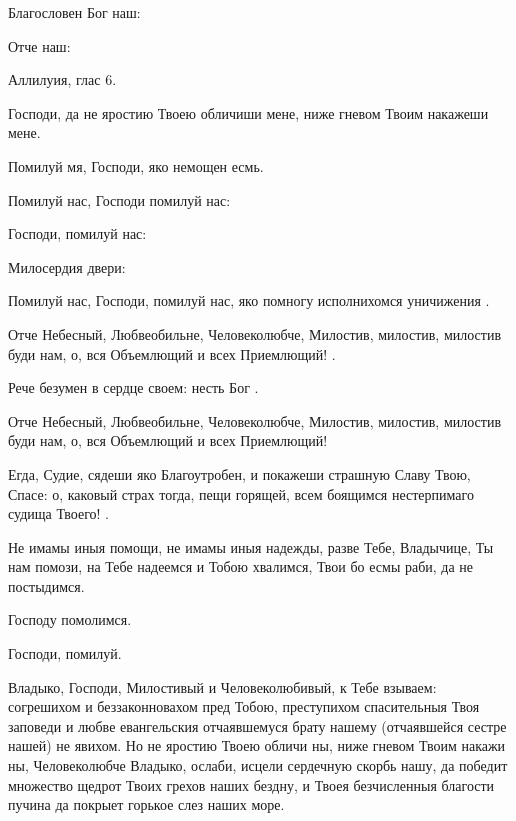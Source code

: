 \begin{mymulticols}

Благословен Бог наш:

 Отче наш:

Аллилуия, глас 6.

 Господи, да не яростию Твоею обличиши мене, ниже гневом Твоим накажеши мене. 

 Помилуй мя, Господи, яко немощен есмь.

 Помилуй нас, Господи помилуй нас:

 Господи, помилуй нас:

 Милосердия двери:



 Помилуй нас, Господи, помилуй нас, яко помногу исполнихомся уничижения .

Отче Небесный, Любвеобильне, Человеколюбче, Милостив, милостив, милостив буди нам, о, вся Объемлющий и всех Приемлющий! .

 Рече безумен в сердце своем: несть Бог .

Отче Небесный, Любвеобильне, Человеколюбче, Милостив, милостив, милостив буди нам, о, вся Объемлющий и всех Приемлющий!

Егда, Судие, сядеши яко Благоутробен, и покажеши страшную Славу Твою, Спасе: о, каковый страх тогда, пещи горящей, всем боящимся нестерпимаго судища Твоего! .

Не имамы иныя помощи, не имамы иныя надежды, разве Тебе, Владычице, Ты нам помози, на Тебе надеемся и Тобою хвалимся, Твои бо есмы раби, да не постыдимся.

Господу помолимся.

Господи, помилуй.


Владыко, Господи, Милостивый и Человеколюбивый, к Тебе взываем: согрешихом и беззаконновахом пред Тобою, преступихом спасительныя Твоя заповеди и любве евангельския отчаявшемуся брату нашему (отчаявшейся сестре нашей) не явихом. Но не яростию Твоею обличи ны, ниже гневом Твоим накажи ны, Человеколюбче Владыко, ослаби, исцели сердечную скорбь нашу, да победит множество щедрот Твоих грехов наших бездну, и Твоея безчисленныя благости пучина да покрыет горькое слез наших море.


\end{mymulticols}
